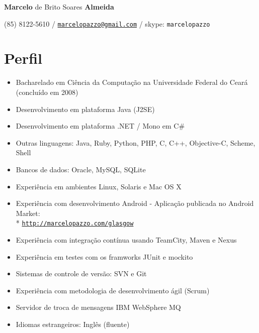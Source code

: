 \documentclass[11pt]{article}
\def\name{\textbf{Marcelo} de Brito Soares \textbf{Almeida}}
\begin{document}
\begin{flushright}

{\huge \name}


\vspace{0.05in}
(85) 8122-5610 / \href{mailto:marcelopazzo@gmail.com}{\tt marcelopazzo@gmail.com} / skype: \tt marcelopazzo

\end{flushright}

\section*{Perfil}
\begin{itemize}
  \item Bacharelado em Ciência da Computação na Universidade Federal do Ceará (concluído em 2008)
  \item Desenvolvimento em plataforma Java (J2SE)
  \item Desenvolvimento em plataforma .NET / Mono em C\#
  \item Outras linguagens: Java, Ruby, Python, PHP, C, C++, Objective-C, Scheme, Shell
  \item Bancos de dados: Oracle, MySQL, SQLite
  \item Experiência em ambientes Linux, Solaris e Mac OS X
  \item Experiência com desenvolvimento Android - Aplicação publicada no Android Market: \\*
            \href{http://marcelopazzo.com/glasgow}{\tt http://marcelopazzo.com/glasgow}
  \item Experiência com integração contínua usando TeamCity, Maven e Nexus
  \item Experiência em testes com os framworks JUnit e mockito
  \item Sistemas de controle de versão: SVN e Git
  \item Experiência com metodologia de desenvolvimento ágil (Scrum)
  \item Servidor de troca de mensagens IBM WebSphere MQ
  \item Idiomas estrangeiros: Inglês (fluente)
\end{itemize}
\end{document}
